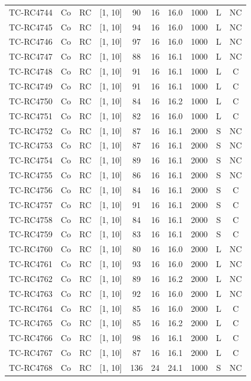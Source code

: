 \begin{longtable}{lccccccccc}
TC-RC4744 & Co & RC & [1, 10] & 90 & 16 & 16.0 & 1000 & L & NC \\
TC-RC4745 & Co & RC & [1, 10] & 94 & 16 & 16.0 & 1000 & L & NC \\
TC-RC4746 & Co & RC & [1, 10] & 97 & 16 & 16.0 & 1000 & L & NC \\
TC-RC4747 & Co & RC & [1, 10] & 88 & 16 & 16.1 & 1000 & L & NC \\
TC-RC4748 & Co & RC & [1, 10] & 91 & 16 & 16.1 & 1000 & L & C \\
TC-RC4749 & Co & RC & [1, 10] & 91 & 16 & 16.1 & 1000 & L & C \\
TC-RC4750 & Co & RC & [1, 10] & 84 & 16 & 16.2 & 1000 & L & C \\
TC-RC4751 & Co & RC & [1, 10] & 82 & 16 & 16.0 & 1000 & L & C \\
TC-RC4752 & Co & RC & [1, 10] & 87 & 16 & 16.1 & 2000 & S & NC \\
TC-RC4753 & Co & RC & [1, 10] & 87 & 16 & 16.1 & 2000 & S & NC \\
TC-RC4754 & Co & RC & [1, 10] & 89 & 16 & 16.1 & 2000 & S & NC \\
TC-RC4755 & Co & RC & [1, 10] & 86 & 16 & 16.1 & 2000 & S & NC \\
TC-RC4756 & Co & RC & [1, 10] & 84 & 16 & 16.1 & 2000 & S & C \\
TC-RC4757 & Co & RC & [1, 10] & 91 & 16 & 16.1 & 2000 & S & C \\
TC-RC4758 & Co & RC & [1, 10] & 84 & 16 & 16.1 & 2000 & S & C \\
TC-RC4759 & Co & RC & [1, 10] & 83 & 16 & 16.1 & 2000 & S & C \\
TC-RC4760 & Co & RC & [1, 10] & 80 & 16 & 16.0 & 2000 & L & NC \\
TC-RC4761 & Co & RC & [1, 10] & 93 & 16 & 16.0 & 2000 & L & NC \\
TC-RC4762 & Co & RC & [1, 10] & 89 & 16 & 16.2 & 2000 & L & NC \\
TC-RC4763 & Co & RC & [1, 10] & 92 & 16 & 16.0 & 2000 & L & NC \\
TC-RC4764 & Co & RC & [1, 10] & 85 & 16 & 16.0 & 2000 & L & C \\
TC-RC4765 & Co & RC & [1, 10] & 85 & 16 & 16.2 & 2000 & L & C \\
TC-RC4766 & Co & RC & [1, 10] & 98 & 16 & 16.1 & 2000 & L & C \\
TC-RC4767 & Co & RC & [1, 10] & 87 & 16 & 16.1 & 2000 & L & C \\
TC-RC4768 & Co & RC & [1, 10] & 136 & 24 & 24.1 & 1000 & S & NC \\

\end{longtable}
